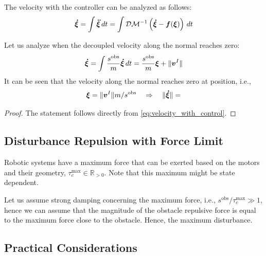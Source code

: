 \documentclass[conference]{IEEEtran}
\begin{document}
The velocity with the controller can be analyzed as follows:
\begin{equation}
    \boldsymbol{\dot \xi} = \int \boldsymbol{\ddot \xi} \, dt = \int \mathcal{D} \mathcal{M}^{-1} \left( \boldsymbol{\dot \xi} - \boldsymbol{f}(\boldsymbol{\xi}) \right) \, dt
\end{equation}

Let us analyze when the decoupled velocity along the normal reaches zero:
\begin{equation}
    \vecs{\dot \xi} = \int \frac{s^{\mathrm{obs}}}{m} \vecs{\dot \xi} \, dt = \frac{s^{\mathrm{obs}}}{m} \vecs{\xi} + \| \vecs v^I \| \label{eq:velocity_with_control}
\end{equation}
It can be seen that the velocity along the normal reaches zero at position, i.e., 
\begin{equation}
    \boldsymbol{\xi} = \| \boldsymbol{v}^I \| {m} / {s^{\mathrm{obs}}} 
    \quad \Rightarrow \quad
    \| \boldsymbol{\dot \xi} \| =
\end{equation}

\begin{lemma}

\end{lemma}

\begin{proof}
The statement follows directly from \eqref{eq:velocity_with_control}.
\end{proof}

\subsection{Disturbance Repulsion with Force Limit}
Robotic systems have a maximum force that can be exerted based on the motors and their geometry, $\tau_c^{\mathrm{max}} \in \mathbb{R}_{>0}$. Note that this maximum might be state dependent.

Let  us assume strong damping concerning the maximum force, i.e., $s^{\mathrm{obs}} / \tau_c^{\mathrm{max}} \gg 1$, hence we can assume that the magnitude of the obstacle repulsive force is equal to the maximum force close to the obstacle. Hence, the maximum disturbance.

\subsection{Practical Considerations}
\end{document}
